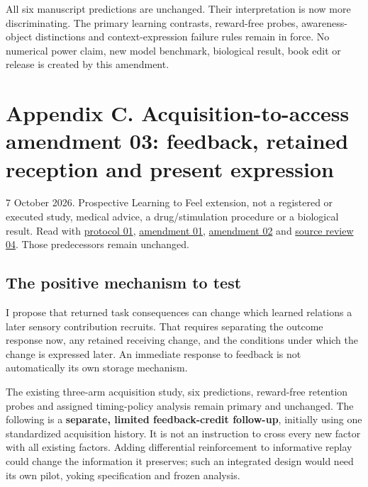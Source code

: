 \documentclass[
  american,
  11pt,
  letterpaper,
]{article}
\begin{document}
All six manuscript predictions are unchanged. Their interpretation is now more discriminating. The primary learning contrasts, reward-free probes, awareness-object distinctions and context-expression failure rules remain in force. No numerical power claim, new model benchmark, biological result, book edit or release is created by this amendment.

\clearpage
\hypertarget{appendix-c}{}

\section{Appendix C. Acquisition-to-access amendment 03: feedback, retained reception and present expression}\label{appendix-c.-acquisition-to-access-amendment-03-feedback-retained-reception-and-present-expression}

7 October 2026. Prospective Learning to Feel extension, not a registered or executed study, medical advice, a drug/stimulation procedure or a biological result. Read with \href{https://github.com/v5ma/v5ma.github.io/blob/master/papers/companions/learning-to-feel-v1.0/ARTIFACT-AVAILABILITY.md#artifact-1}{protocol 01}, \href{https://raw.githubusercontent.com/v5ma/v5ma.github.io/master/papers/companions/learning-to-feel-v1.0/Learning-to-Feel-Technical-Supplement-v1.0.pdf\#appendix-a}{amendment 01}, \href{https://raw.githubusercontent.com/v5ma/v5ma.github.io/master/papers/companions/learning-to-feel-v1.0/Learning-to-Feel-Technical-Supplement-v1.0.pdf\#appendix-b}{amendment 02} and \href{https://github.com/v5ma/v5ma.github.io/blob/master/papers/companions/learning-to-feel-v1.0/ARTIFACT-AVAILABILITY.md#artifact-13}{source review 04}. Those predecessors remain unchanged.

\subsection{The positive mechanism to test}\label{the-positive-mechanism-to-test}

I propose that returned task consequences can change which learned relations a later sensory contribution recruits. That requires separating the outcome response now, any retained receiving change, and the conditions under which the change is expressed later. An immediate response to feedback is not automatically its own storage mechanism.

The existing three-arm acquisition study, six predictions, reward-free retention probes and assigned timing-policy analysis remain primary and unchanged. The following is a \textbf{separate, limited feedback-credit follow-up}, initially using one standardized acquisition history. It is not an instruction to cross every new factor with all existing factors. Adding differential reinforcement to informative replay could change the information it preserves; such an integrated design would need its own pilot, yoking specification and frozen analysis.
\end{document}

